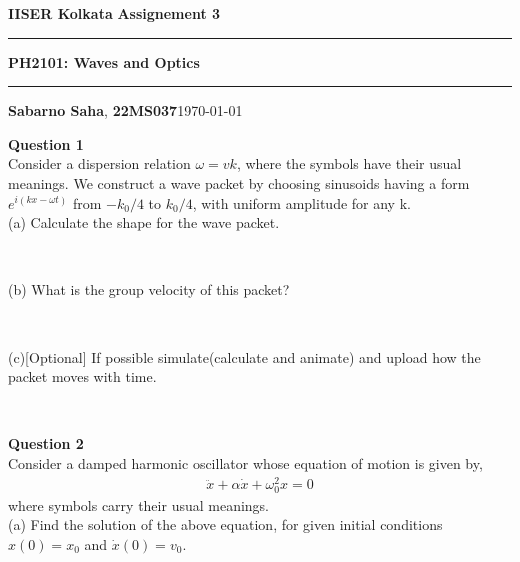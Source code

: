 \documentclass[addpoints]{exam}
\newcommand{\AssignmentName}{Assignement 3}
\newcommand{\subjectcode}{PH2101}
\begin{document}
\par\textbf{IISER Kolkata} \hfill \textbf{\AssignmentName}
\vspace{3pt}
\hrule
\vspace{3pt}
\begin{center}
        \LARGE{\textbf{\subjectcode : Waves and Optics}}
\end{center}
\vspace{3pt}

\hrule
\vspace{4pt}
\textbf{Sabarno Saha}, \textbf{22MS037}\hfill \today

\vspace{20pt}

\bigskip

\begin{questions}

\question \textbf{ Question 1}\\
Consider a dispersion relation $\omega = vk$, where the symbols have their usual meanings. We
construct a wave packet by choosing sinusoids having a form $e^{i(kx-\omega t)}$ from $-k_0/4$
to $k_0/4$, with uniform amplitude for any k.\\
(a) Calculate the shape for the wave packet.

\begin{solution}\\
 
\end{solution}

(b) What is the group velocity of this packet?
\begin{solution}\\
 
\end{solution}

(c)[Optional] If possible simulate(calculate and animate) and upload how the packet moves with 
time.
\begin{solution}\\
 
\end{solution}

\question \textbf{ Question 2}\\
Consider a damped harmonic oscillator whose equation of motion is given by,
\begin{align*}
    \ddot{x}+\alpha\dot{x}+\omega_0^2x = 0
\end{align*}
where symbols carry their usual meanings.\\ 
(a) Find the solution of the above equation, for given initial conditions $x(0) = x_0$ and 
$\dot{x}(0) = v_0$.
\begin{solution}\\
 

\end{solution}
\end{questions}
\end{document}
